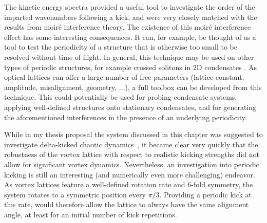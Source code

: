 The kinetic energy spectra provided a useful tool to investigate the order of the imparted wavenumbers following a kick, and were very closely matched with the results from moir\'e interference theory. The existence of this moir\'e interference effect has some interesting consequences. It can, for example, be thought of as a tool to test the periodicity of a structure that is otherwise too small to be resolved without time of flight. In general, this technique may be used on other types of periodic structures, for example crossed solitons in 2D condensates \cite{BEC:Morgan_soliton_2013}. As optical lattices can offer a large number of free parameters (lattice constant, amplitude, misalignment, geometry, $\ldots$), a full toolbox can be developed from this technique. This could potentially be used for probing condensate systems, applying well-defined structures onto stationary condensates, and for generating the aforementioned interferences in the presence of an underlying periodicity.


While in my thesis proposal the system discussed in this chapter was suggested to investigate delta-kicked chaotic dynamics~\cite{CT:Gardiner_pra_2000}, it became clear very quickly that the robustness of the vortex lattice with respect to realistic kicking strengths did not allow for significant vortex dynamics. Nevertheless, an investigation into periodic kicking is still an interesting (and numerically even more challenging) endeavor. As vortex lattices feature a well-defined rotation rate and 6-fold symmetry, the system rotates to a symmetric position every $\pi/3$. Providing a periodic kick at this rate, would therefore allow the lattice to always have the same alignment angle, at least for an initial number of kick repetitions.
